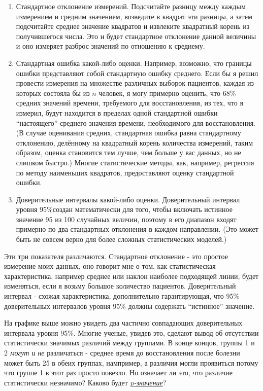 \begin{enumerate}

\item Стандартное отклонение измерений. Подсчитайте разницу между каждым измерением и средним значением, возведите в квадрат эти разницы, а затем подсчитайте среднее значение квадратов и извлеките квадратный корень из получившегося числа. Это и будет стандартное отклонение данной величины и оно измеряет разброс значений по отношению к среднему.

\item Стандартная ошибка какой-либо оценки. Например, возможно, что границы ошибки представляют собой стандартную ошибку среднего. Если бы я решил провести измерения на  множестве различных выборок пациентов, каждая из которых состояла бы из $n$ человек, я могу примерно оценить, что 68\% средних значений времени, требуемого для восстановления, из тех, что я измерил, будут находится в пределах одной стандартной ошибки ``настоящего'' среднего значения времени, необходимого для восстановления. (В случае оценивания средних, стандартная ошибка равна стандартному отклонению, делённому на квадратный корень количества измерений, таким образом, оценка становится тем лучше, чем больше у вас данных, но не слишком быстро.) Многие статистические методы, как, например, регрессия по методу наименьших квадратов, предоставляют оценку стандартной ошибки.   

\item Доверительные интервалы какой-либо оценки. Доверительный интервал уровня 95\%создан математически для того, чтобы включать истинное значение 95 из 100 случайных величин, поэтому в его диапазон входят примерно по два стандартных отклонения в каждом направлении. (Это может быть не совсем верно для более сложных статистических моделей.)  

\end{enumerate}  

Эти три показателя различаются. Стандартное отклонение - это простое измерение моих данных, оно говорит мне о том, как статистическая характеристика, например среднее или наклон наиболее подходящей линии, будет изменяться, если я возьму большое количество пациентов. Доверительный интервал - схожая характеристика, дополнительно гарантирующая, что 95\% доверительных интервалов уровня 95\% должны содержать ``истинное'' значение. 

На графике выше можно увидеть два частично совпадающих доверительных интервала уровня 95\%. Многие ученые, увидев это, сделают вывод об отсутствии статистически значимых различий между группами. В конце концов, группы 1 и 2 \emph{могут и не} различаться - среднее время до восстановления после болезни может быть 25 в обеих группах, нампример, а различия могли проявиться потому что группе 1 в этот раз просто повезло. Но означает ли это, что различие статистически незначимо? Каково будет \emph{\hyperref[chp2:pvalues]{p-значение}}?

